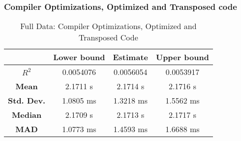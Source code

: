 \subsubsection{Compiler Optimizations, Optimized and Transposed code}
\begin{table}[H]
\centering
\begin{tabular}{|c|c|c|c|}
\hline
\textbf{} & \textbf{Lower bound} & \textbf{Estimate} & \textbf{Upper bound} \\
\hline
\textbf{$R^2$} & 0.0054076 & 0.0056054 & 0.0053917 \\
\hline
\textbf{Mean} & 2.1711 s & 2.1714 s & 2.1716 s \\
\hline
\textbf{Std. Dev.} & 1.0805 ms & 1.3218 ms & 1.5562 ms \\
\hline
\textbf{Median} & 2.1709 s & 2.1713 s & 2.1717 s \\
\hline
\textbf{MAD} & 1.0773 ms & 1.4593 ms & 1.6688 ms \\
\hline
\end{tabular}
\caption{Full Data: Compiler Optimizations, Optimized and Transposed Code}
\end{table}


